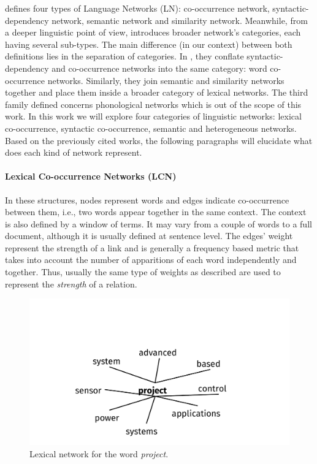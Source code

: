 \cite{Mihalcea2011} defines four types of Language Networks (LN): co-occurrence network, syntactic-dependency network, semantic network and similarity network. Meanwhile, from a deeper linguistic point of view, \cite{Choudhury2009} introduces broader network's categories, each having several sub-types. The main difference (in our context) between both definitions lies in the separation of categories. In \cite{Choudhury2009}, they conflate syntactic-dependency and co-occurrence networks into the same  category: word co-occurrence networks. Similarly, they join semantic and similarity networks together and place them inside a broader category of lexical networks. The third  family  defined concerns phonological networks which is out of the scope of this work. In this work we will explore four categories of linguistic networks: lexical co-occurrence, syntactic co-occurrence, semantic and heterogeneous networks. Based  on the previously cited works, the following paragraphs will elucidate what does each kind of network represent.



\paragraph{Lexical Co-occurrence Networks (LCN)}

 In these structures, nodes represent words and edges indicate co-occurrence between them, i.e., two words appear together in the same context. The context is also defined by a window of terms. It may vary from a couple of words to a full document, although it is usually defined at sentence level. The edges' weight  represent the strength of a link and is generally a frequency based metric that takes into account the  number of apparitions of each word independently and together. Thus, usually the same type of weights as described are used to represent the \textit{strength}  of a relation.

\begin{figure}[!h]
\centering
\includegraphics[width=0.8\linewidth]{images/Chapitre2/lex_net1.pdf}
\caption{Lexical network for the word \textit{project}.}
\label{fig:lex_net1}
\end{figure}


